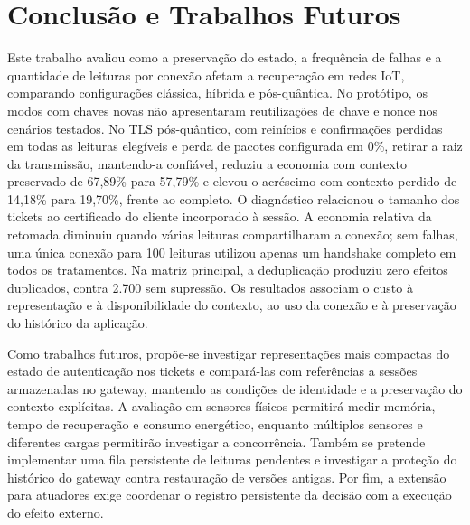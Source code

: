 \section{Conclusão e Trabalhos Futuros}
\label{sec:conclusao}

Este trabalho avaliou como a preservação do estado, a frequência de falhas e a quantidade de leituras por conexão afetam a recuperação em redes IoT, comparando configurações clássica, híbrida e pós-quântica. No protótipo, os modos com chaves novas não apresentaram reutilizações de chave e nonce nos cenários testados. No TLS pós-quântico, com reinícios e confirmações perdidas em todas as leituras elegíveis e perda de pacotes configurada em 0\%, retirar a raiz da transmissão, mantendo-a confiável, reduziu a economia com contexto preservado de 67,89\% para 57,79\% e elevou o acréscimo com contexto perdido de 14,18\% para 19,70\%, frente ao completo. O diagnóstico relacionou o tamanho dos tickets ao certificado do cliente incorporado à sessão. A economia relativa da retomada diminuiu quando várias leituras compartilharam a conexão; sem falhas, uma única conexão para 100 leituras utilizou apenas um handshake completo em todos os tratamentos. Na matriz principal, a deduplicação produziu zero efeitos duplicados, contra 2.700 sem supressão. Os resultados associam o custo à representação e à disponibilidade do contexto, ao uso da conexão e à preservação do histórico da aplicação.

Como trabalhos futuros, propõe-se investigar representações mais compactas do estado de autenticação nos tickets e compará-las com referências a sessões armazenadas no gateway, mantendo as condições de identidade e a preservação do contexto explícitas. A avaliação em sensores físicos permitirá medir memória, tempo de recuperação e consumo energético, enquanto múltiplos sensores e diferentes cargas permitirão investigar a concorrência. Também se pretende implementar uma fila persistente de leituras pendentes e investigar a proteção do histórico do gateway contra restauração de versões antigas. Por fim, a extensão para atuadores exige coordenar o registro persistente da decisão com a execução do efeito externo.
